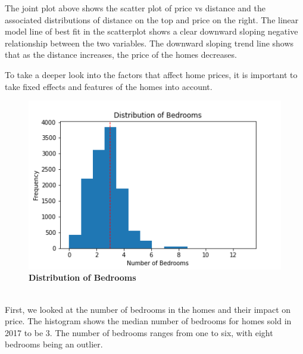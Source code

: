 \documentclass[12pt]{report}
\newcommand\tab[1][.60cm]{\hspace*{#1}}
\begin{document}
The joint plot above shows the scatter plot of price vs distance and the associated distributions of distance on the top and price on the right. The linear model line of best fit in the scatterplot shows a clear downward sloping negative relationship between the two variables. The downward sloping trend line shows that as the distance increases, the price of the homes decreases. 
\clearpage

To take a deeper look into the factors that affect home prices, it is important to take fixed effects and features of the homes into account.
\begin{figure}[h]
\begin{center}
\includegraphics[width=130mm]{bedroomHist.png}
\end{center}
\caption{\textbf{Distribution of Bedrooms}}
\label{fig:bedHist}
\end{figure}
\\
\tab First, we looked at the number of bedrooms in the homes and their impact on price.
The histogram shows the median number of bedrooms for homes sold in 2017 to be 3. The number of bedrooms ranges from one to six, with eight bedrooms being an outlier.
\clearpage
\end{document}
